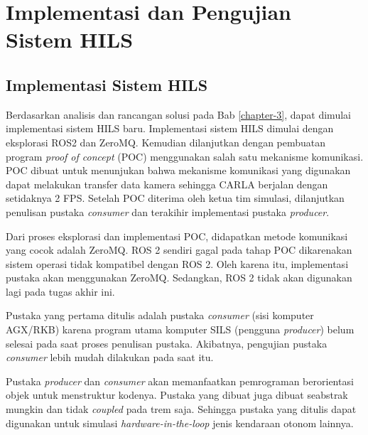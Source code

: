 \chapter{Implementasi dan Pengujian Sistem HILS}\label{chapter-4}

\section{Implementasi Sistem HILS}

Berdasarkan analisis dan rancangan solusi pada Bab \ref{chapter-3}, dapat
dimulai implementasi sistem HILS baru. Implementasi sistem HILS dimulai dengan
eksplorasi ROS2 dan ZeroMQ. Kemudian dilanjutkan dengan pembuatan program
\textit{proof of concept} (POC) menggunakan salah satu mekanisme komunikasi.
POC dibuat untuk menunjukan bahwa mekanisme komunikasi yang digunakan dapat
melakukan transfer data kamera sehingga CARLA berjalan dengan setidaknya 2 FPS.
Setelah POC diterima oleh ketua tim simulasi, dilanjutkan penulisan pustaka
\textit{consumer} dan terakihir implementasi pustaka \textit{producer}.

Dari proses eksplorasi dan implementasi POC, didapatkan metode komunikasi yang
cocok adalah ZeroMQ. ROS 2 sendiri gagal pada tahap POC dikarenakan sistem
operasi tidak kompatibel dengan ROS 2. Oleh karena itu, implementasi pustaka
akan menggunakan ZeroMQ. Sedangkan, ROS 2 tidak akan digunakan lagi pada tugas
akhir ini.

Pustaka yang pertama ditulis adalah pustaka \textit{consumer} (sisi
komputer AGX/RKB) karena program utama komputer SILS (pengguna
\textit{producer}) belum selesai pada saat proses penulisan pustaka. Akibatnya,
pengujian pustaka \textit{consumer} lebih mudah dilakukan pada saat itu.

Pustaka \textit{producer} dan \textit{consumer} akan memanfaatkan pemrograman
berorientasi objek untuk menstruktur kodenya. Pustaka yang dibuat juga dibuat
seabstrak mungkin dan tidak \textit{coupled} pada trem saja. Sehingga pustaka
yang ditulis dapat digunakan untuk simulasi \textit{hardware-in-the-loop} jenis
kendaraan otonom lainnya.

